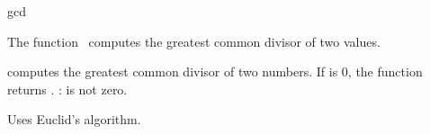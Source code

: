 \begin{ccRefFunction}{gcd}

\ccDefinition

The function \ccRefName\ computes the greatest common divisor of two values.


{
computes the greatest common divisor of two numbers. If  is
0, the function returns .
\ccPrecond:  is not zero.
}

\ccImplementation

Uses Euclid's algorithm.

\end{ccRefFunction}
